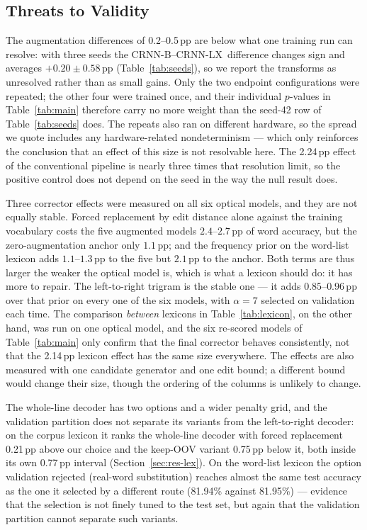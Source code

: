 \documentclass{ws-ijprai}
\newcommand{\ours}{CRNN-LX}            %
\newcommand{\anchordelta}{2.24}        %
\begin{document}
\subsection{Threats to Validity}

The augmentation differences of 0.2--0.5\,pp are below what one
training run can resolve: with three seeds the CRNN-B--\ours\
difference changes sign and averages $+0.20\pm0.58$\,pp
(Table~\ref{tab:seeds}), so we report the transforms as unresolved
rather than as small gains. Only the two endpoint configurations were
repeated; the other four were trained once, and their
individual $p$-values in Table~\ref{tab:main} therefore carry no more
weight than the seed-42 row of Table~\ref{tab:seeds} does. The
repeats also ran on different hardware, so the spread we quote
includes any hardware-related nondeterminism --- which only reinforces
the conclusion that an effect of this size is not resolvable here.
The \anchordelta\,pp effect of the conventional pipeline is nearly three
times that resolution limit, so the positive control
does not depend on the seed in the way the null result does.

Three corrector effects were measured on all six optical models, and they
are not equally stable. Forced replacement by edit distance alone against
the training vocabulary costs the five augmented models $2.4$--$2.7$\,pp of word accuracy, but the
zero-augmentation anchor only $1.1$\,pp; and the frequency prior on the
word-list lexicon adds $1.1$--$1.3$\,pp to the five but $2.1$\,pp to the
anchor. Both terms are thus larger the weaker the optical model is, which is
what a lexicon should do: it has more to repair. The left-to-right trigram is
the stable one --- it adds $0.85$--$0.96$\,pp over that prior on every one of
the six models, with $\alpha=7$ selected on validation each time. The comparison \emph{between} lexicons in
Table~\ref{tab:lexicon}, on the other hand, was run on one optical model,
and the six re-scored models of Table~\ref{tab:main} only confirm that the
final corrector behaves consistently, not that the 2.14\,pp lexicon effect
has the same size everywhere. The effects are also measured with one
candidate generator and one edit bound; a different bound would change their
size, though the ordering of the columns is unlikely to change.

The
whole-line decoder has two options and a wider penalty grid, and the
validation partition does not separate its variants from the left-to-right
decoder: on the corpus lexicon it ranks the whole-line decoder with forced
replacement 0.21\,pp above our choice and the keep-OOV variant 0.75\,pp below
it, both inside its own 0.77\,pp interval
(Section~\ref{sec:res-lex}). On the word-list lexicon the option validation
rejected (real-word substitution) reaches almost the same test accuracy as
the one it selected by a different route (81.94\% against 81.95\%) ---
evidence that the selection is not finely tuned to the test set, but again
that the validation partition cannot separate such variants.
\end{document}
